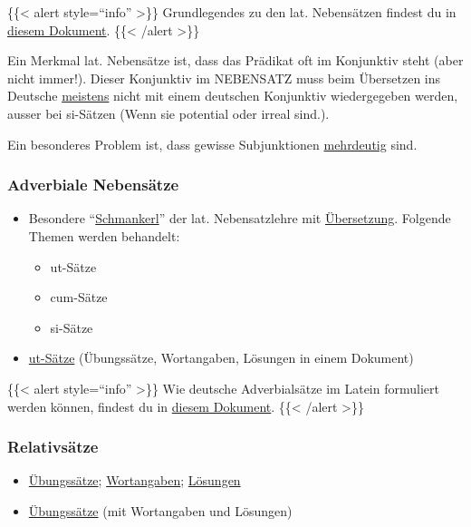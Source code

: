 \documentclass{scrartcl}
\begin{document}
\{\{< alert style="`info"' >\}\} Grundlegendes zu den lat. Nebensätzen findest du in \href{https://www.dropbox.com/s/fw6yy5i00lxn5iy/Lat\_Nebens\%25C3\%25A4tze.pdf?dl=0}{diesem Dokument}. \{\{< /alert >\}\}



Ein Merkmal lat. Nebensätze ist, dass das Prädikat oft im Konjunktiv
steht (aber nicht immer!). Dieser Konjunktiv im NEBENSATZ muss beim
Übersetzen ins Deutsche \uline{meistens} nicht mit einem deutschen Konjunktiv
wiedergegeben werden, ausser bei si-Sätzen (Wenn sie potential oder irreal sind.).

Ein besonderes Problem ist, dass gewisse Subjunktionen \href{https://www.dropbox.com/s/dchnzatbir1f1jg/Mehrdeutige\%20Nebensatzeinleitungen2.pdf?dl=0}{mehrdeutig} sind.

\subsubsection{Adverbiale Nebensätze}
\label{sec:org0f3f1c6}

\begin{itemize}
\item Besondere "`\href{https://www.dropbox.com/s/qundz0kc7wi3sp0/grammatik.pdf?dl=0}{Schmankerl}"' der lat. Nebensatzlehre mit
\href{https://www.dropbox.com/s/rv0zs8gtuk155ho/Grammatikrepetition\_\%25C3\%259Cbersetzung.pdf?dl=0}{Übersetzung}. Folgende Themen werden behandelt:
\begin{itemize}
\item ut-Sätze
\item cum-Sätze
\item si-Sätze
\end{itemize}
\item \href{https://www.dropbox.com/s/smmjy9k0a33qfwm/\%25C2\%25A751ut.pdf?dl=0}{ut-Sätze} (Übungssätze, Wortangaben, Lösungen in einem Dokument)
\end{itemize}

\{\{< alert style="`info"' >\}\}
  Wie deutsche Adverbialsätze im Latein formuliert werden können, findest du in \href{https://www.dropbox.com/s/spd916spyliu4zu/dt\_Adverbials\%C3\%A4tze\_im\_Lat.pdf?dl=0}{diesem Dokument}.
\{\{< /alert >\}\}

\subsubsection{Relativsätze}
\label{sec:orga592efe}

\begin{itemize}
\item \href{https://www.dropbox.com/s/60ggp3yeav4ofe8/Relativs\%25C3\%25A4tze.pdf?dl=0}{Übungssätze}; \href{https://www.dropbox.com/s/ipz22adwi00i8o8/\%25C2\%25A747Relativs\%25C3\%25A4tze.pdf?dl=0}{Wortangaben}; \href{https://www.dropbox.com/s/fttk7f0dwqlrag9/Relativs\%25C3\%25A4tze\_L\%25C3\%25B6sung.pdf?dl=0}{Lösungen}
\item \href{https://www.dropbox.com/s/xxtjdft670v04y2/Relativsatz.pdf?dl=0}{Übungssätze} (mit Wortangaben und Lösungen)
\end{itemize}
\end{document}
